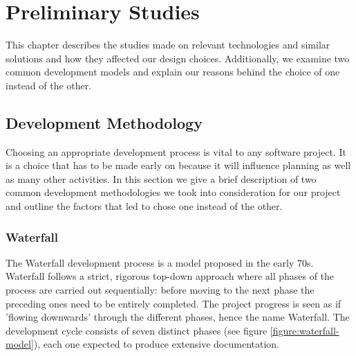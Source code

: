\chapter{Preliminary Studies}
\label{Preliminary Studies}

This chapter describes the studies made on relevant technologies and similar solutions and how they affected our design choices. 
Additionally, we examine two common development models and explain our reasons behind the choice of one instead of the other.


\section{Development Methodology}
\label{section:development-methodology}

Choosing an appropriate development process is vital to any software project.
It is a choice that has to be made early on because it will influence planning as well as many other activities. 
In this section we give a brief description of two common development methodologies we took into consideration
for our project and outline the factors that led to chose one instead of the other.

\subsection{Waterfall}

The Waterfall development process is a model proposed in the early 70s.
Waterfall follows a strict, rigorous top-down approach where all phases of the process are carried out sequentially: before moving to the next phase the preceding ones need to be entirely completed. The project progress is seen as if 'flowing downwards' through the different phases, hence the name Waterfall. 
The development cycle consists of seven distinct phases (see figure \ref{figure:waterfall-model}), each one expected to produce extensive documentation.

